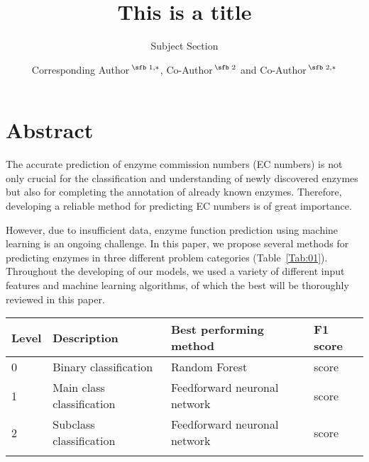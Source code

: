 \documentclass{bioinfo}
\begin{document}

\subtitle{Subject Section}

\title[References]{This is a title}
\author[Sample \textit{et~al}.]{Corresponding Author\,$^{\text{\sfb 1,}*}$, Co-Author\,$^{\text{\sfb 2}}$ and Co-Author\,$^{\text{\sfb 2,}*}$}
\address{$^{\text{\sf 1}}$Department, Institution, City, Post Code, Country and \\
$^{\text{\sf 2}}$Department, Institution, City, Post Code,
Country.}





\maketitle

\section{Abstract}
The accurate prediction of enzyme commission numbers (EC numbers) is not only crucial for 
the classification and understanding of newly discovered enzymes but also for completing the annotation of already known enzymes.
Therefore, developing a reliable method for predicting EC numbers is of great importance.

However, due to insufficient data, enzyme function prediction using machine learning is an ongoing challenge.
In this paper, we propose several methods for predicting enzymes in three different problem categories (Table~\ref{Tab:01}).
Throughout the developing of our models, we used a variety of different input features and machine learning algorithms, of which the best will be thoroughly reviewed in this paper.
\begin{center}
\begin{table}[!htbp]
 {\begin{tabular}{@{}llll@{}}\toprule 
		Level & Description & Best performing method & F1 score\\\midrule
		0 & Binary classification & Random Forest & score\\
		1 & Main class classification & Feedforward neuronal network & score \\
		2 & Subclass classification & Feedforward neuronal network & score \\\botrule
\end{tabular}}{}
\end{table}
\end{center}
\end{document}
